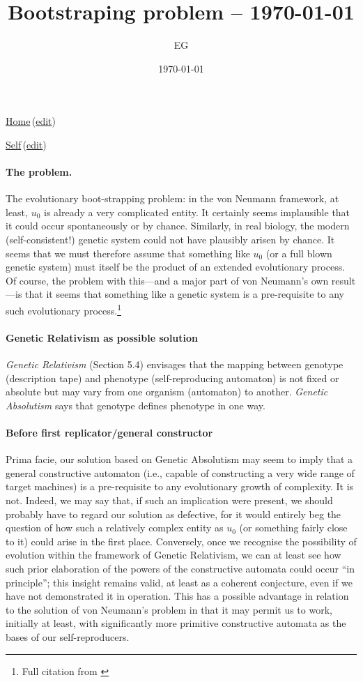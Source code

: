 \documentclass[12pt]{paper}
\title{Bootstraping problem -- \today}
\author{EG}
\date{\today}
\newcommand{\wikilink}[2] { \href{#1.pdf}{#2}\,(\href{#1.tex}{edit})}
\begin{document}
 \maketitle
 
 \wikilink{home}{Home}

\wikilink{bootstraping_problem}{Self}
 
 \tableofcontents
 
\paragraph{The problem.} The evolutionary boot-strapping problem: in the von Neumann framework, at 
least, $u_0$ is already a very complicated entity. It certainly seems implausible that it could 
occur
spontaneously or by chance. Similarly, in real biology, the modern (self-consistent!)
genetic system could not have plausibly arisen by chance. It seems that we must
therefore assume that something like $u_0$ (or a full blown genetic system) must itself
be the product of an extended evolutionary process. Of course, the problem with
this—and a major part of von Neumann’s own result—is that it seems that something
like a genetic system is a pre-requisite to any such evolutionary 
process.\footnote{\label{note1}Full citation from \cite{McMullin2000}}


\paragraph{Genetic Relativism as possible solution}
\textit{Genetic Relativism} \cite{McMullin1992}(Section 5.4) envisages that the mapping 
between genotype (description tape) and phenotype (self-reproducing automaton) is not fixed or 
absolute but may vary from one organism (automaton) to another.
 \textit{Genetic Absolutism} says that genotype defines phenotype in one way.


\paragraph{Before first replicator/general constructor}
Prima facie, our solution based on Genetic Absolutism may seem to imply that a general constructive 
automaton (i.e., capable of constructing a very wide range of target machines) is a pre-requisite to 
any evolutionary growth of complexity. It is not. Indeed, we may say that, if such an implication 
were present, we should probably have to regard our solution as defective, for it would entirely beg 
the question of how such a relatively complex entity as $u_0$ (or something fairly close to it) 
could arise in the first place. Conversely, once we recognise the possibility of evolution within 
the framework of Genetic Relativism, we can at least see how such prior elaboration of the powers of 
the constructive automata could occur ``in principle''; this insight remains valid, at least as a
coherent conjecture, even if we have not demonstrated it in operation. This has a possible advantage 
in relation to the solution of von Neumann’s problem in that it may permit us to
work, initially at least, with significantly more primitive constructive automata as the bases
of our self-reproducers.
\end{document}
